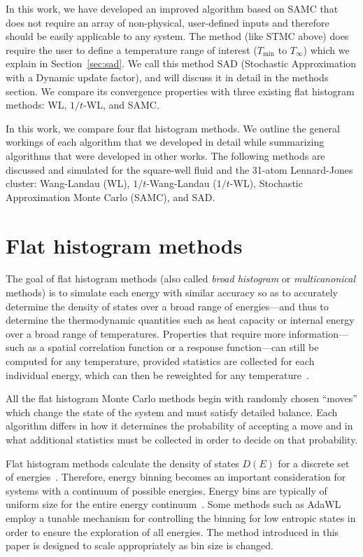 \documentclass[letterpaper,twocolumn,amsmath,amssymb,pre,aps,10pt]{revtex4-1}
\begin{document}
In this work, we have developed an improved algorithm based on SAMC that does
not require an array of non-physical, user-defined inputs and therefore should
be easily applicable to any system. The method (like STMC above) does require
the user to define a temperature range of interest ($T_\text{min}$ to
$T_\infty$) which we explain in Section~\ref{sec:sad}.  We call this method SAD (Stochastic Approximation with a Dynamic
update factor), and will discuss it in detail in the methods section. We compare
its convergence properties with three existing flat histogram methods: WL,
$1/t$-WL, and SAMC.

In this work, we compare four flat histogram methods.  We outline the
general workings of each algorithm that we developed in detail while
summarizing algorithms that were developed in other works.  The
following methods are discussed and simulated for the square-well
fluid and the 31-atom Lennard-Jones cluster: Wang-Landau (WL),
$1/t$-Wang-Landau ($1/t$-WL), Stochastic Approximation Monte Carlo
(SAMC), and SAD.

\section{Flat histogram methods}\label{sec:histogram}
The goal of flat histogram methods (also called \emph{broad histogram}
or \emph{multicanonical} methods) is to simulate each energy with
similar accuracy so as to accurately determine the density of states
over a broad range of energies---and thus to determine the thermodynamic
quantities such as heat capacity or internal energy
over a broad range of temperatures.
Properties that require more information---such as a spatial
correlation function or a response function---can still be computed
for any temperature, provided statistics are collected for each
individual energy, which can then be reweighted for any
temperature~\cite{panagiotopoulos1998phase, panagiotopoulos2000monte,
errington2003direct}.

All the flat histogram Monte Carlo methods begin with randomly chosen
``moves'' which change the state of the system and must satisfy
detailed balance.  Each algorithm differs in how it determines the
probability of accepting a move and in what additional statistics must
be collected in order to decide on that probability.

Flat histogram methods calculate the density of states $D(E)$ for a discrete set
of energies~\cite{wang2001determining, dayal2004performance, troyer2003flat,
trebst2004optimizing}. Therefore, energy binning becomes an important
consideration for systems with a continuum of possible energies.  Energy bins
are typically of uniform size for the entire energy
continuum~\cite{fasnacht2004adaptive}. Some methods such as
AdaWL~\cite{koh2013dynamically} employ a tunable mechanism for controlling the
binning for low entropic states in order to ensure the exploration of all
energies.  The method introduced in this paper is designed to scale appropriately
as bin size is changed.
\end{document}
